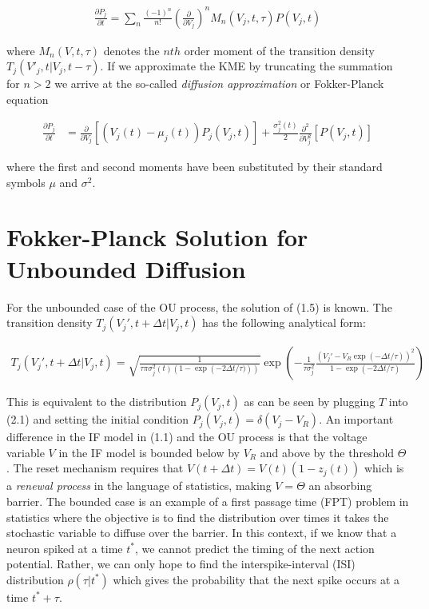 \documentclass{ucetd}
\begin{document}
\begin{align}
\frac{\partial P_{j}}{\partial t} = \sum_{n} \frac{(-1)^{n}}{n!} \left(\frac{\partial}{\partial V_{j}}\right)^{n} M_{n}(V_{j},t,\tau) P(V_{j},t)
\end{align}

where $M_{n}(V,t,\tau)$ denotes the $nth$ order moment of the transition density $T_{j}(V'_{j}, t | V_{j}, t-\tau)$. If we approximate the KME by truncating the summation for $n > 2$ we arrive at the so-called \emph{diffusion approximation} or Fokker-Planck equation

\begin{align}
\frac{\partial P_{j}}{\partial t} &= \frac{\partial}{\partial V_{j}}[\left(V_{j}(t)-\mu_{j}(t)\right) P_{j}(V_{j},t)] + \frac{\sigma_{j}^{2}(t)}{2}\frac{\partial^{2}}{\partial V_{j}^{2}}[P(V_{j},t)]
\end{align}

where the first and second moments have been substituted by their standard symbols $\mu$ and $\sigma^{2}$.

\section{Fokker-Planck Solution for Unbounded Diffusion}

For the unbounded case of the OU process, the solution of (1.5) is known. The transition density $T_{j}(V_{j}',t+\Delta t|V_{j},t)$ has the following analytical form:

\begin{align}
T_{j}(V_{j}',t+\Delta t|V_{j},t) = \sqrt{\frac{1}{\tau\pi\sigma_{j}^{2}(t)(1-\exp\left(-2\Delta t/\tau)\right))}}\exp\left(-\frac{1}{\tau\sigma_{j}^{2}}\frac{(V_{j}'-V_{R}\exp(-\Delta t/\tau))^{2}}{1-\exp\left(-2\Delta t/\tau\right)}\right)
\end{align} 

This is equivalent to the distribution $P_{j}(V_{j},t)$ as can be seen by plugging $T$ into (2.1) and setting the initial condition $P_{j}(V_{j},t) = \delta(V_{j}-V_{R})$.  An important difference in the IF model in (1.1) and the OU process is that the voltage variable $V$ in the IF model is bounded below by $V_{R}$ and above by the threshold $\Theta$. The reset mechanism requires that $V(t+\Delta t) = V(t)(1-z_{j}(t))$ which is a \emph{renewal process} in the language of statistics, making $V = \Theta$ an absorbing barrier. The bounded case is an example of a first passage time (FPT) problem in statistics where the objective is to find the distribution over times it takes the stochastic variable to diffuse over the barrier. In this context, if we know that a neuron spiked at a time $t^{*}$, we cannot predict the timing of the next action potential. Rather, we can only hope to find the interspike-interval (ISI) distribution $\rho(\tau | t^{*})$ which gives the probability that the next spike occurs at a time $t^{*} + \tau$.  
\end{document}
